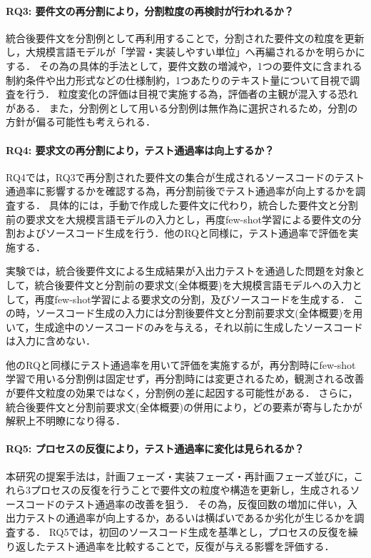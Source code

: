 \documentclass[11pt]{jreport}
\begin{document}
\paragraph{RQ3: 要件文の再分割により，分割粒度の再検討が行われるか？}
統合後要件文を分割例として再利用することで，分割された要件文の粒度を更新し，大規模言語モデルが「学習・実装しやすい単位」へ再編されるかを明らかにする．
その為の具体的手法として，要件文数の増減や，1つの要件文に含まれる制約条件や出力形式などの仕様制約，1つあたりのテキスト量について目視で調査を行う．
粒度変化の評価は目視で実施する為，評価者の主観が混入する恐れがある．
また，分割例として用いる分割例は無作為に選択されるため，分割の方針が偏る可能性も考えられる．

\paragraph{RQ4: 要求文の再分割により，テスト通過率は向上するか？}
RQ4では，RQ3で再分割された要件文の集合が生成されるソースコードのテスト通過率に影響するかを確認する為，再分割前後でテスト通過率が向上するかを調査する．
具体的には，手動で作成した要件文に代わり，統合した要件文と分割前の要求文を大規模言語モデルの入力とし，再度few-shot学習による要件文の分割およびソースコード生成を行う．他のRQと同様に，テスト通過率で評価を実施する．

実験では，統合後要件文による生成結果が入出力テストを通過した問題を対象として，統合後要件文と分割前の要求文(全体概要)を大規模言語モデルへの入力として，再度few-shot学習による要求文の分割，及びソースコードを生成する．
この時，ソースコード生成の入力には分割後要件文と分割前要求文(全体概要)を用いて，生成途中のソースコードのみを与える，それ以前に生成したソースコードは入力に含めない．

他のRQと同様にテスト通過率を用いて評価を実施するが，再分割時にfew-shot学習で用いる分割例は固定せず，再分割時には変更されるため，観測される改善が要件文粒度の効果ではなく，分割例の差に起因する可能性がある．
さらに，統合後要件文と分割前要求文(全体概要)の併用により，どの要素が寄与したかが解釈上不明瞭になり得る．

\paragraph{RQ5: プロセスの反復により，テスト通過率に変化は見られるか？}
本研究の提案手法は，計画フェーズ・実装フェーズ・再計画フェーズ並びに，これら3プロセスの反復を行うことで要件文の粒度や構造を更新し，生成されるソースコードのテスト通過率の改善を狙う．
その為，反復回数の増加に伴い，入出力テストの通過率が向上するか，あるいは横ばいであるか劣化が生じるかを調査する．
RQ5では，初回のソースコード生成を基準とし，プロセスの反復を繰り返したテスト通過率を比較することで，反復が与える影響を評価する．
\end{document}
